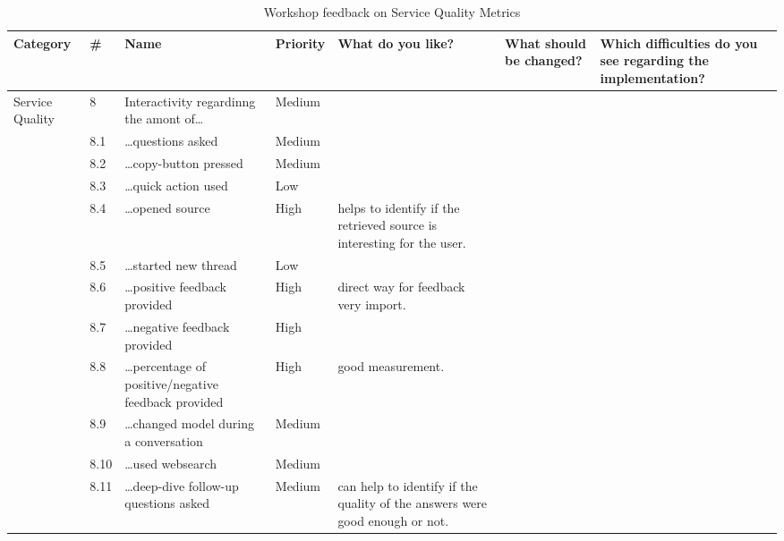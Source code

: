 \documentclass[
	english,
	ruledheaders=section,%
	class=report,%
	thesis={type=bachelor},%
	accentcolor=1b,%
	custommargins=true,%
	marginpar=false,%
	parskip=half-,%
	fontsize=11pt,%
	DIV=14,
]{tudapub}
\begin{document}
\begin{table}
    \centering
    \small 
    \caption{Workshop feedback on Service Quality Metrics}
    \label{tab:service_quality}
    \begin{tabularx}{\textheight}{p{2.2cm} l >{\RaggedRight\arraybackslash}X l >{\RaggedRight\arraybackslash}X >{\RaggedRight\arraybackslash}X >{\RaggedRight\arraybackslash}X}
        \toprule
        \textbf{Category} & \textbf{\#} & \textbf{Name} & \textbf{Priority} & \textbf{What do you like?} & \textbf{What should be changed?} & \textbf{Which difficulties do you see regarding the implementation?} \\
        \midrule
        \multirow{12}{=}{Service Quality} 
        & 8 & Interactivity regardinng the amont of\dots & Medium & & & \\
        \cmidrule(l){2-7}
        & 8.1 & \dots questions asked & Medium & & & \\
        \cmidrule(l){2-7}
        & 8.2 & \dots copy-button pressed & Medium & & & \\
        \cmidrule(l){2-7}
        & 8.3 & \dots quick action used & Low & & & \\
        \cmidrule(l){2-7}
        & 8.4 & \dots opened source & High & helps to identify if the retrieved source is interesting for the user. & & \\
        \cmidrule(l){2-7}
        & 8.5 & \dots started new thread & Low & & & \\
        \cmidrule(l){2-7}
        & 8.6 & \dots positive feedback provided & High & direct way for feedback very import. & & \\
        \cmidrule(l){2-7}
        & 8.7 & \dots negative feedback provided & High & & & \\
        \cmidrule(l){2-7}
        & 8.8 & \dots percentage of positive/negative feedback provided & High & good measurement. & & \\
        \cmidrule(l){2-7}
        & 8.9 & \dots changed model during a conversation & Medium & & & \\
        \cmidrule(l){2-7}
        & 8.10 & \dots used websearch & Medium & & & \\
        \cmidrule(l){2-7}
        & 8.11 & \dots deep-dive follow-up questions asked & Medium & can help to identify if the quality of the answers were good enough or not. & & \\
        \bottomrule
    \end{tabularx}
\end{table}
\clearpage
\end{document}
